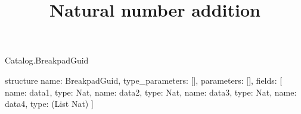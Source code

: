 \begin{lexlean}{Catalog.BreakpadGuid}
\title{Natural number addition}
\begin{semanticmodule}
structure{
  name: BreakpadGuid,
  type_parameters: [],
  parameters: [],
  fields: [
    {name: data1, type: Nat},
    {name: data2, type: Nat},
    {name: data3, type: Nat},
    {name: data4, type: (List Nat)}
  ]
}
\end{semanticmodule}
\end{lexlean}

